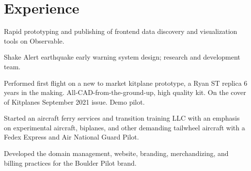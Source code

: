 \documentclass[]{mershon-two-column-resume}
\begin{document}
\begin{minipage}[t]{0.33\textwidth}
		\sectionsep
				
		
	\end{minipage} 
	\hfill
	\begin{minipage}[t]{0.66\textwidth} 
		
		
		\section{Experience}
		
		\vspace{\topsep} %
		\begin{tightemize}
			\item Rapid prototyping and publishing of frontend data discovery and visualization tools on Observable.
			\item Shake Alert earthquake early warning system design; research and development team.
		\end{tightemize}
		\sectionsep
				
		
		\vspace{\topsep} %
		\begin{tightemize}
			\item Performed first flight on a new to market kitplane prototype, a Ryan ST replica 6 years in the making. All-CAD-from-the-ground-up, high quality kit. On the cover of Kitplanes September 2021 issue. Demo pilot.
		\end{tightemize}
		\sectionsep
		
		\begin{tightemize}
			\item Started an aircraft ferry services and transition training LLC with an emphasis on experimental aircraft, biplanes, and other demanding tailwheel aircraft with a Fedex Express and Air National Guard Pilot.
			\item Developed the domain management, website, branding, merchandizing, and billing practices for the Boulder Pilot brand.
		\end{tightemize}
		\sectionsep
		

\end{minipage}
\end{document}
